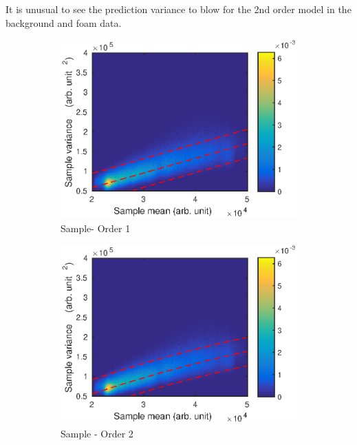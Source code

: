 \documentclass[12pt]{report}
\begin{document}
It is unusual to see the prediction variance to blow for the 2nd order model in the background and foam data.

\begin{figure}
	\centering
	\begin{subfigure}{0.45\textwidth}
		\includegraphics[width=\textwidth]{figures/meanVar/subsample_sample1.eps}
		\caption{Sample- Order 1}
	\end{subfigure}
	\begin{subfigure}{0.45\textwidth}
		\includegraphics[width=\textwidth]{figures/meanVar/subsample_sample2.eps}
		\caption{Sample - Order 2}
	\end{subfigure}
	\begin{subfigure}{0.45\textwidth}

\end{subfigure}
\end{figure}
\end{document}
